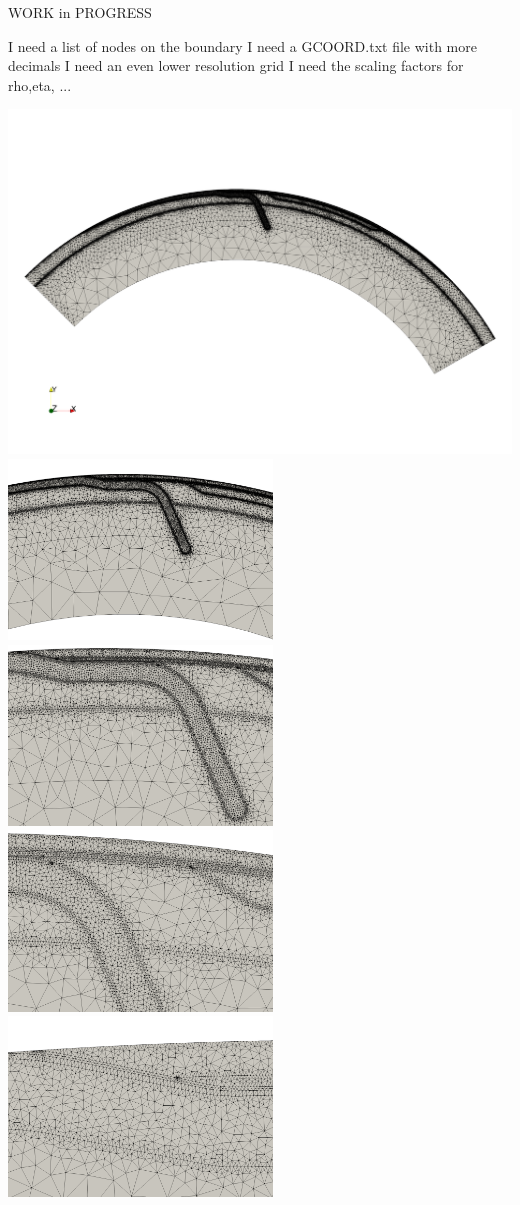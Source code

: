 
WORK in PROGRESS

I need a list of nodes on the boundary
I need a GCOORD.txt file with more decimals
I need an even lower resolution  grid
I need the scaling factors for rho,eta, ...


\includegraphics[width=14cm]{python_codes/fieldstone_44/grid_lowres1}\\
\includegraphics[width=7cm]{python_codes/fieldstone_44/grid_lowres2}
\includegraphics[width=7cm]{python_codes/fieldstone_44/grid_lowres3}\\
\includegraphics[width=7cm]{python_codes/fieldstone_44/grid_lowres4}
\includegraphics[width=7cm]{python_codes/fieldstone_44/grid_lowres5}


